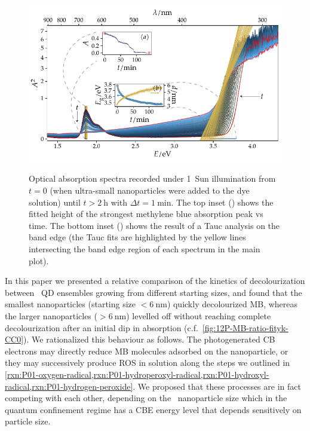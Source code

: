 \documentclass[webedition,openright,titles,swedish,english]{LuaUUThesis}\usepackage[]{graphicx}\usepackage[]{xcolor}
\newenvironment{knitrout}{}{} %
\newcommand{\cf}{c.f.}
\begin{document}
\begin{figure}[tbp]
\centering
\begin{knitrout}\scriptsize
{}\color{fgcolor}

{\centering \includegraphics[width=4.72in]{figure/0512P-fig-MB-N04H-small-nostir-photodegradation-1} 

}


\end{knitrout}
{\label{fig-a:P12-MB-N04H-small-nostir-photodegradation}}
{\label{fig-b:P12-MB-N04H-small-nostir-photodegradation}}
\caption[Photocatalytic degradation of MB with \ZnO\ QDs]{%
   Optical absorption spectra recorded under 1~Sun illumination from $t=0$
   (when ultra-small  nanoparticles were added to the  dye solution)
   until $t>\qty{2}{\hour}$ with $\Delta t=\qty{1}{\minute}$.
   The top inset () shows
   the fitted height of the strongest methylene blue absorption peak vs time.
   The bottom inset () shows
   the result of a Tauc analysis on the band edge (the Tauc fits are highlighted by
   the yellow lines intersecting the band edge region of each spectrum in the main plot).}
\label{fig:P12-MB-N04H-small-nostir-photodegradation}
\end{figure}

In this paper we presented a relative comparison of the kinetics of decolourization
between \ZnO\ \gls{QD} ensembles growing from different starting sizes, and found
that the smallest nanoparticles (starting size $<\qty{6}{\nm}$) quickly
decolourized \gls{MB}, whereas the larger nanoparticles ($>\qty{6}{\nm}$)
levelled off without reaching complete decolourization after an initial dip
in absorption (\cf\ \cref{fig:12P-MB-ratio-fityk-CC0}).
We rationalized this behaviour as follows.
The photogenerated \gls{CB} electrons may directly reduce \gls{MB} molecules
adsorbed on the nanoparticle, or they may successively produce \gls{ROS} in solution
along the steps we outlined
in \cref{rxn:P01-oxygen-radical,rxn:P01-hydroperoxyl-radical,rxn:P01-hydroxyl-radical,rxn:P01-hydrogen-peroxide}.
We proposed that these processes are in fact competing with each other, depending
on the \ZnO\ nanoparticle size which in the quantum confinement regime has a
\gls{CBE} energy level that depends sensitively on particle size.
\end{document}
